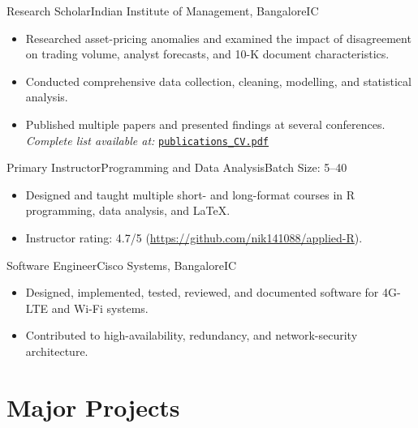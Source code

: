 \documentclass[11pt,a4paper]{moderncv}
\begin{document}
    {Research Scholar}{Indian Institute of Management, Bangalore}{}{IC}{
    \begin{itemize}
        \item Researched asset-pricing anomalies and examined the impact of disagreement on trading volume, analyst forecasts, and 10-K document characteristics.
        \item Conducted comprehensive data collection, cleaning, modelling, and statistical analysis.
        \item Published multiple papers and presented findings at several conferences. \textit{Complete list available at:}
\href{https://github.com/nik141088/CV/blob/main/publications_CV.pdf}{\texttt{publications\_CV.pdf}}
    \end{itemize}
    }

    {Primary Instructor}{Programming and Data Analysis}{}{Batch Size: 5--40}{
    \begin{itemize}
        \item Designed and taught multiple short- and long-format courses in R programming, data analysis, and LaTeX.
        \item Instructor rating: 4.7/5 (\href{https://github.com/nik141088/applied-R}{https://github.com/nik141088/applied-R}).
    \end{itemize}
    }

    {Software Engineer}{Cisco Systems, Bangalore}{}{IC}{
    \begin{itemize}
        \item Designed, implemented, tested, reviewed, and documented software for 4G-LTE and Wi-Fi systems.
        \item Contributed to high-availability, redundancy, and network-security architecture.
    \end{itemize}
    }


\hypertarget{major-projects}{
\section{Major Projects}\label{major-projects}}
\end{document}
